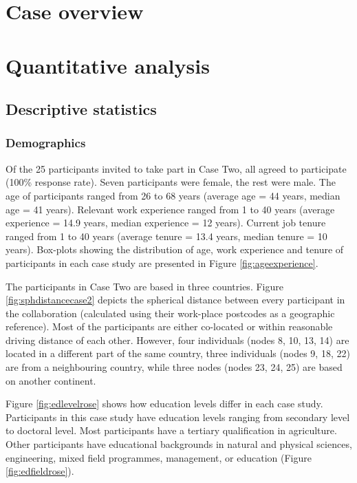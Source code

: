 


\section{Case overview}



\section{Quantitative analysis}

\subsection{Descriptive statistics}

\subsubsection{Demographics}

Of the 25 participants invited to take part in Case Two, all agreed to participate (100\% response rate). Seven participants were female, the rest were male. The age of participants ranged from 26 to 68 years (average age = 44 years, median age = 41 years). Relevant work experience ranged from 1 to 40 years (average experience = 14.9 years, median experience = 12 years). Current job tenure ranged from 1 to 40 years (average tenure = 13.4 years, median tenure = 10 years). Box-plots showing the distribution of age, work experience and tenure of participants in each case study are presented in Figure \ref{fig:ageexperience}.\medskip

The participants in Case Two are based in three countries. Figure \ref{fig:sphdistancecase2} depicts the spherical distance between every participant in the collaboration (calculated using their work-place postcodes as a geographic reference). Most of the participants are either co-located or within reasonable driving distance of each other. However, four individuals (nodes 8, 10, 13, 14) are located in a different part of the same country, three individuals (nodes 9, 18, 22) are from a neighbouring country, while three nodes (nodes 23, 24, 25) are based on another continent.\medskip

Figure \ref{fig:edlevelrose} shows how education levels differ in each case study. Participants in this case study have education levels ranging from secondary level to doctoral level. Most participants have a tertiary qualification in agriculture. Other participants have educational backgrounds in natural and physical sciences, engineering, mixed field programmes, management, or education (Figure \ref{fig:edfieldrose}). 

